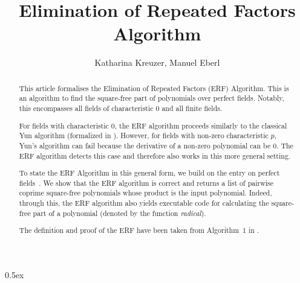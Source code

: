 \documentclass[11pt,a4paper]{article}
\begin{document}
\title{Elimination of Repeated Factors Algorithm}
\author{Katharina Kreuzer, Manuel Eberl}
\maketitle

\begin{abstract}
This article formalises the Elimination of Repeated Factors (ERF) Algorithm. This is an algorithm to find the square-free part of polynomials over perfect fields. Notably, this encompasses all fields of characteristic $0$ and all finite fields.

For fields with characteristic $0$, the ERF algorithm proceeds similarly to the classical Yun algorithm (formalized in \cite[File \texttt{Square\_\allowbreak Free\_\allowbreak Factorization.\allowbreak thy}]{Yun}). 
However, for fields with non-zero characteristic $p$, Yun's algorithm can fail because the derivative of a non-zero polynomial can be $0$. The ERF algorithm detects this case and therefore also works in this more general setting.

To state the ERF Algorithm in this general form, we build on the entry on perfect fields~\cite{Perfect_Fields}.
We show that the ERF algorithm is correct and returns a list of pairwise coprime square-free polynomials whose product is the input polynomial. Indeed, through this, the ERF algorithm also yields executable code for calculating the square-free part of a polynomial (denoted by the function \emph{radical}).

The definition and proof of the ERF have been taken from Algorithm~1 in \cite {Scott}.
\end{abstract}


\newpage
\tableofcontents

\newpage
\parindent 0pt\parskip 0.5ex



\raggedright


\end{document}
